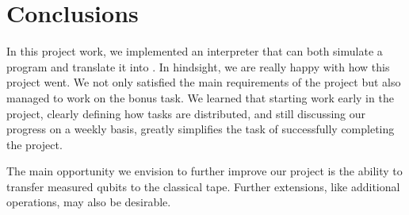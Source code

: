 \section{Conclusions}
\label{sec:conclusion}

In this project work, we implemented an interpreter that can both simulate a \bfq{} program and translate it into \qiskit{}. In hindsight, we are really happy with how this project went. We not only satisfied the main requirements of the project but also managed to work on the bonus task. We learned that starting work early in the project, clearly defining how tasks are distributed, and still discussing our progress on a weekly basis, greatly simplifies the task of successfully completing the project.

The main opportunity we envision to further improve our project is the ability to transfer measured qubits to the classical \bfck{} tape. Further extensions, like additional operations, may also be desirable.
